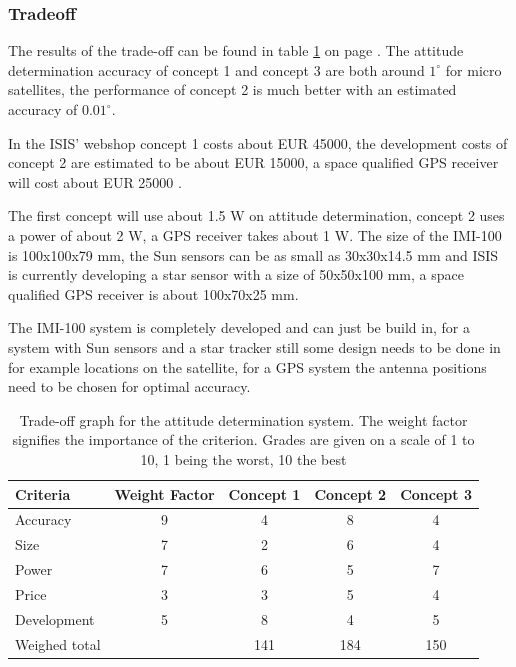 \subsubsection{Tradeoff}
The results of the trade-off can be found in table \ref{tab:adstradeoff} on page \pageref{tab:adstradeoff}. 
The attitude determination accuracy of concept 1 and concept 3 are both around $1^\circ$ for micro satellites, the performance of concept 2 is much better with an estimated accuracy of $0.01^\circ$.

In the \ac{ISIS}' webshop \cite{cubesatshop} concept 1 costs about EUR 45000, the development costs of concept 2 are estimated to be about EUR 15000, a space qualified \ac{GPS} receiver will cost about EUR 25000 \cite{spacequest}.

The first concept will use about 1.5 W on attitude determination, concept 2 uses a power of about 2 W, a \ac{GPS} receiver takes about 1 W.
The size of the IMI-100 is 100x100x79 mm, the Sun sensors can be as small as 30x30x14.5 mm \cite{tnoweb} and \ac{ISIS} is currently developing a star sensor with a size of 50x50x100 mm, a space qualified \ac{GPS} receiver is about 100x70x25 mm. 

The IMI-100 system is completely developed and can just be build in, for a system with Sun sensors and a star tracker still some design needs to be done in for example locations on the satellite, for a \ac{GPS} system the antenna positions need to be chosen for optimal accuracy.

\begin{table} [h]
\centering
\begin{tabular}{p{3cm} | c | c c c}
\textbf{Criteria} & \textbf{Weight Factor} & \textbf{Concept 1} & \textbf{Concept 2} & \textbf{Concept 3} \\ \hline \hline
Accuracy    & 9 & 4 & 8 & 4\\
Size        & 7 & 2 & 6 & 4\\
Power       & 7 & 6 & 5 & 7\\
Price       & 3 & 3 & 5 & 4\\
Development & 5 & 8 & 4 & 5\\ \hline
Weighed total    &    & 141 & 184 & 150
\end{tabular} 
\caption[Tradeoff attitude determination]{Trade-off graph for the attitude determination system. The weight factor signifies the importance of the criterion. Grades are given on a scale of 1 to 10, 1 being the worst, 10 the best}
\label{tab:adstradeoff}
\end{table}

